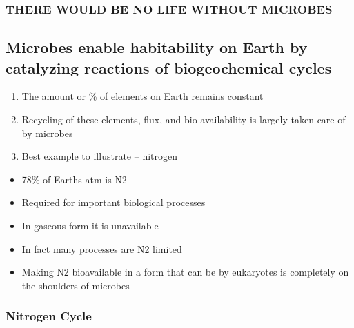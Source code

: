 \documentclass[
]{book}
\providecommand{\tightlist}{%
  \setlength{\itemsep}{0pt}\setlength{\parskip}{0pt}}
\begin{document}
\hypertarget{there-would-be-no-life-without-microbes}{%
\subsubsection*{THERE WOULD BE NO LIFE WITHOUT MICROBES}\label{there-would-be-no-life-without-microbes}}

\hypertarget{microbes-enable-habitability-on-earth-by-catalyzing-reactions-of-biogeochemical-cycles}{%
\subsection{Microbes enable habitability on Earth by catalyzing reactions of biogeochemical cycles}\label{microbes-enable-habitability-on-earth-by-catalyzing-reactions-of-biogeochemical-cycles}}

\begin{enumerate}
\def\labelenumi{\arabic{enumi}.}
\tightlist
\item
  The amount or \% of elements on Earth remains constant
\item
  Recycling of these elements, flux, and bio-availability is
  largely taken care of by microbes
\item
  Best example to illustrate -- nitrogen
\end{enumerate}

\begin{itemize}
\tightlist
\item
  78\% of Earths atm is N2
\item
  Required for important biological processes
\item
  In gaseous form it is unavailable
\item
  In fact many processes are N2 limited
\item
  Making N2 bioavailable in a form that can be
  by eukaryotes is completely on the shoulders of microbes
\end{itemize}

\hypertarget{nitrogen-cycle}{%
\subsubsection{Nitrogen Cycle}\label{nitrogen-cycle}}
\end{document}
